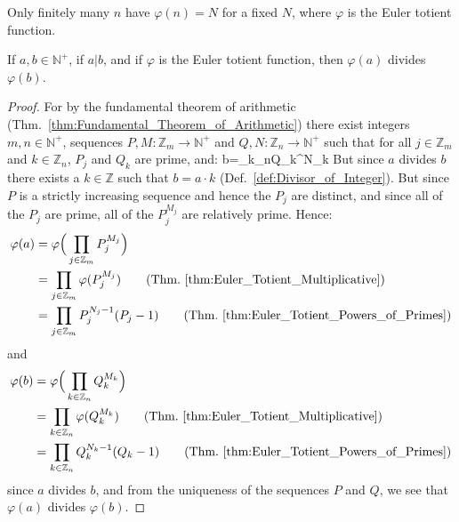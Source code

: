     Only finitely many $n$ have $\varphi(n)=N$ for a fixed $N$, where
    $\varphi$ is the Euler totient function.
    \begin{theorem}
        \label{thm:A_DIV_B_then_EulerTotA_Div_EulerTotB}%
        If $a,b\in\mathbb{N}^{+}$, if $a|b$, and if $\varphi$ is the
        Euler totient function, then $\varphi(a)$ divides $\varphi(b)$.
    \end{theorem}
    \begin{proof}
        For by the fundamental theorem of arithmetic
        (Thm.~\ref{thm:Fundamental_Theorem_of_Arithmetic}) there exist
        integers $m,n\in\mathbb{N}^{+}$, sequences
        $P,M:\mathbb{Z}_{m}\rightarrow\mathbb{N}^{+}$ and
        $Q,N:\mathbb{Z}_{n}\rightarrow\mathbb{N}^{+}$ such that for all
        $j\in\mathbb{Z}_{m}$ and $k\in\mathbb{Z}_{n}$, $P_{j}$ and
        $Q_{k}$ are prime, and:
                    {b=\prod_{k\in{}_{n}}Q_{k}^{N_{k}}}
        But since $a$ divides $b$ there exists a $k\in\mathbb{Z}$ such
        that $b=a\cdot{k}$ (Def.~\ref{def:Divisor_of_Integer}). But
        since $P$ is a strictly increasing sequence and hence the
        $P_{j}$ are distinct, and since all of the $P_{j}$ are prime,
        all of the $P_{j}^{M_{j}}$ are relatively prime. Hence:
        \begin{align*}
            \varphi(a)&=\varphi\Big(
                \prod_{j\in\mathbb{Z}_{m}}P_{j}^{M_{j}}
            \Big)\\
            &=\prod_{j\in\mathbb{Z}_{m}}\varphi(P_{j}^{M_{j}})
                \tag{Thm.~\ref{thm:Euler_Totient_Multiplicative}}\\
            &=\prod_{j\in\mathbb{Z}_{m}}P_{j}^{N_{j}-1}(P_{j}-1)
                \tag{Thm.~\ref{thm:Euler_Totient_Powers_of_Primes}}
        \end{align*}
        and
        \begin{align*}
            \varphi(b)&=\varphi\Big(
                \prod_{k\in\mathbb{Z}_{n}}Q_{k}^{M_{k}}
            \Big)\\
            &=\prod_{k\in\mathbb{Z}_{n}}\varphi(Q_{k}^{M_{k}})
                \tag{Thm.~\ref{thm:Euler_Totient_Multiplicative}}\\
            &=\prod_{k\in\mathbb{Z}_{n}}Q_{k}^{N_{k}-1}(Q_{k}-1)
                \tag{Thm.~\ref{thm:Euler_Totient_Powers_of_Primes}}
        \end{align*}
        since $a$ divides $b$, and from the uniqueness of the sequences
        $P$ and $Q$, we see that $\varphi(a)$ divides $\varphi(b)$.
    \end{proof}
